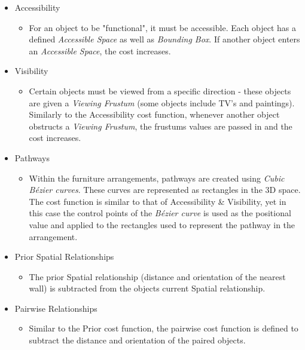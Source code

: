 \begin{itemize}
    \item Accessibility
        \begin{itemize}
            \item For an object to be "functional", it must be accessible. Each object has a defined \textit{Accessible Space} as well as \textit{Bounding Box}. If another object enters an \textit{Accessible Space}, the cost increases. %
        \end{itemize}
    \item Visibility
        \begin{itemize}
            \item Certain objects must be viewed from a specific direction - these objects are given a \textit{Viewing Frustum} (some objects include TV's and paintings). Similarly to the Accessibility cost function, whenever another object obstructs a \textit{Viewing Frustum}, the frustums values are passed in and the cost increases.
        \end{itemize}
    \item Pathways
        \begin{itemize}
            \item Within the furniture arrangements, pathways are created using \textit{Cubic Bézier curves}. These curves are represented as rectangles in the 3D space. The cost function is similar to that of Accessibility \& Visibility, yet in this case the control points of the \textit{Bézier curve} is used as the positional value and applied to the rectangles used to represent the pathway in the arrangement.
        \end{itemize}
    \item Prior Spatial Relationships
        \begin{itemize}
            \item The prior Spatial relationship (distance and orientation of the nearest wall) is subtracted from the objects current Spatial relationship.
        \end{itemize}
    \item Pairwise Relationships
        \begin{itemize}
            \item Similar to the Prior cost function, the pairwise cost function is defined to subtract the distance and orientation of the paired objects.
        \end{itemize}
\end{itemize}
